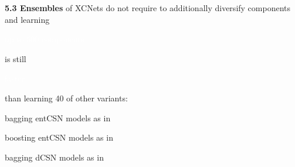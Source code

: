 \documentclass[final]{beamer}
\newcommand{\highlighttext}[2][yellow]{{\colorbox{#1}{\strut\textcolor{white}{#2}}}}
\begin{document}
\begin{frame}{}
\begin{textblock}{17.5}
\vspace{20pt}
{\bf 5.3 Ensembles} of XCNets do not require to additionally
diversify components and learning \highlighttext[lacamlilac]{up to 500 components} is still \highlighttext[gold4]{faster}
than learning 40 of other variants:

\vspace{10pt}

    \begin{center}
      \begin{minipage}{0.9\linewidth}
        \begin{description}[align=parright]
        \item[\textbf{\textsf{CNet}}$_{\mathsf{bag}}$]
          bagging \textsf{entCSN} models as in~\cite{Rahman2016a}\par
        \item[\textbf{\textsf{CNet}}$_{\mathsf{boost}}$]
          boosting \textsf{entCSN} models as in~\cite{Rahman2016a}\par
        \item[\textbf{\textsf{dCSN}}$^{k}$]
          bagging \textsf{dCSN} models as in~\cite{DiMauro2015a,DiMauro2015b}\par
        \end{description}
      \end{minipage}
    \end{center}

  \end{textblock}




\end{frame}
\end{document}

